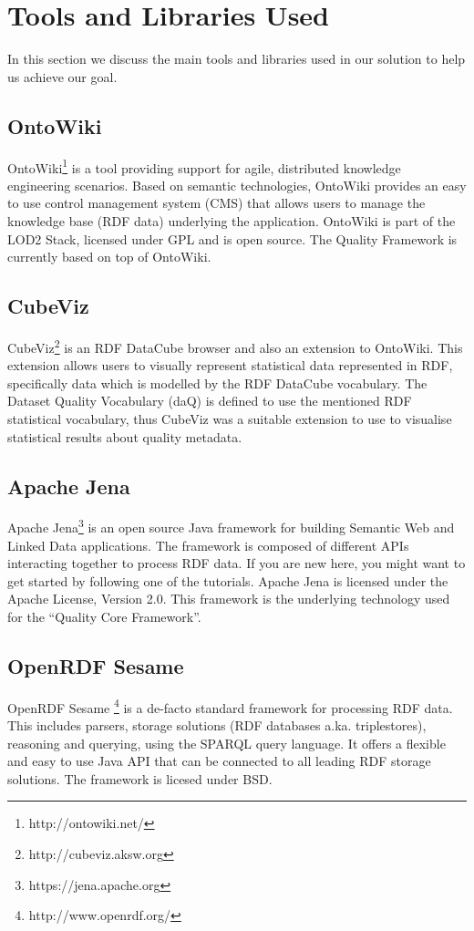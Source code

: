 
\section{Tools and Libraries Used}
\label{sec:Libraries} 

In this section we discuss the main tools and libraries used in our solution to help us achieve our goal.

\subsection{OntoWiki}
\label{sec:OntoWiki}
OntoWiki\footnote{http://ontowiki.net/} is a tool providing support for agile, distributed knowledge engineering scenarios.
Based on semantic technologies, OntoWiki provides an easy to use control management system (CMS) that allows users to manage the knowledge base (RDF data) underlying the application.
OntoWiki is part of the LOD2 Stack, licensed under GPL and is open source.
The Quality Framework is currently based on top of OntoWiki.

\subsection{CubeViz}
\label{sec:CubeViz}
CubeViz\footnote{http://cubeviz.aksw.org} is an RDF DataCube browser and also an extension to OntoWiki.
This extension allows users to visually represent statistical data represented in RDF, specifically data which is modelled by the RDF DataCube vocabulary.
The Dataset Quality Vocabulary (daQ) is defined to use the mentioned RDF statistical vocabulary, thus CubeViz was a suitable extension to use to visualise statistical results about quality metadata.


\subsection{Apache Jena}
\label{sec:Jena}
Apache Jena\footnote{https://jena.apache.org} is an open source Java framework for building Semantic Web and Linked Data applications.
The framework is composed of different APIs interacting together to process RDF data. If you are new here, you might want to get started by following one of the tutorials.
Apache Jena is licensed under the Apache License, Version 2.0. 
This framework is the underlying technology used for the ``Quality Core Framework''.

\subsection{OpenRDF Sesame}
\label{sec:Sesame}
OpenRDF Sesame \footnote{http://www.openrdf.org/} is  a de-facto standard framework for processing RDF data. 
This includes parsers, storage solutions (RDF databases a.ka. triplestores), reasoning and querying, using the SPARQL query language. 
It offers a flexible and easy to use Java API that can be connected to all leading RDF storage solutions. 
The framework is licesed under BSD.


